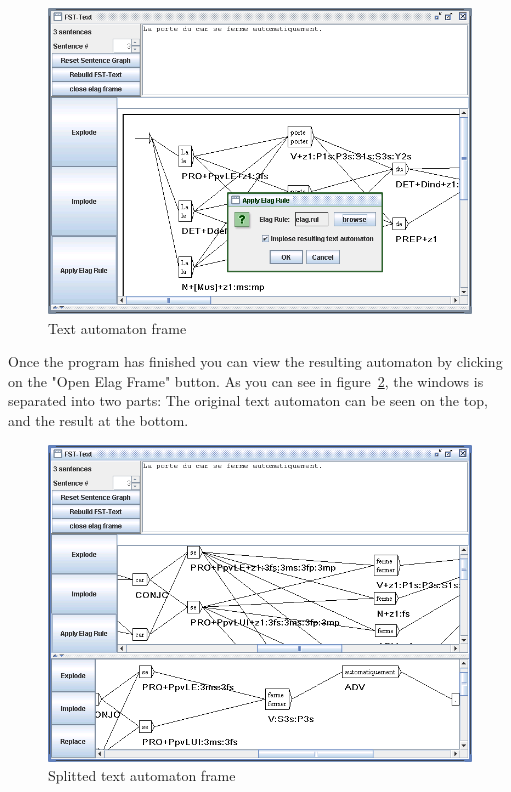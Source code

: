 \begin{figure}[!ht]
\begin{center}
\includegraphics[width=12cm]{resources/img/fig7-17.png}
\caption{Text automaton frame \label{fig-text-auto1}}
\end{center}
\end{figure}

\bigskip
\noindent Once the program has finished you can view the resulting automaton by clicking on
the "Open Elag Frame" button. As you can see in figure~\ref{fig-text-auto2},
the windows is separated into two parts: The original text automaton can be seen
on the top, and the result at the bottom.

\begin{figure}[!ht]
\begin{center}
\includegraphics[width=12cm]{resources/img/fig7-18.png}
\caption{Splitted text automaton frame \label{fig-text-auto2}}
\end{center}
\end{figure}

